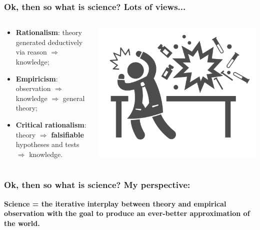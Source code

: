 \documentclass[aspectratio=169]{beamer}
\theoremstyle{principle}
\begin{document}
\begin{frame}
\frametitle{Ok, then so what is science?  Lots of views...}

\begin{columns}
\begin{column}{0.5\textwidth}

\begin{itemize}
\item \textbf{Rationalism}: theory generated deductively via reason $\Rightarrow$ knowledge;
\bigskip
\bigskip
\item \textbf{Empiricism}: observation $\Rightarrow$ knowledge $\Rightarrow$ general theory;
\bigskip
\bigskip
\item \textbf{Critical rationalism}: theory $\Rightarrow$ \textbf{falsifiable} hypotheses and tests $\Rightarrow$ knowledge.
\end{itemize}

\end{column}
\begin{column}{0.5\textwidth}
\includegraphics[scale=0.4]{experiment.png}
\end{column}
\end{columns}
\end{frame}

\begin{frame}
\frametitle{Ok, then so what is science? My perspective:}
\begin{center}
\Large \textbf{Science = the iterative interplay between theory and empirical observation with the goal to produce an ever-better approximation of the world.}
\end{center}
\end{frame}
\end{document}
